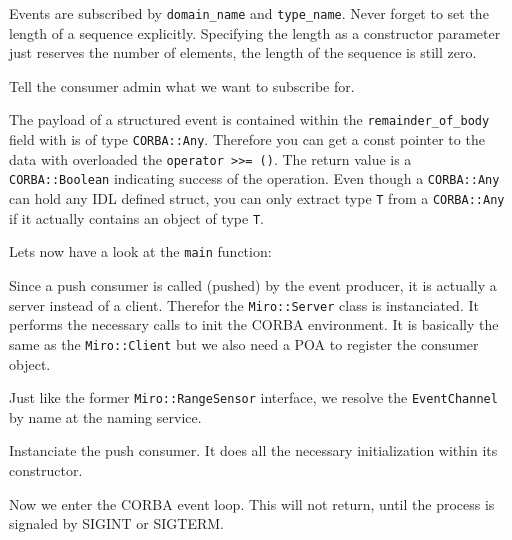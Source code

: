 

Events are subscribed by \lstinline!domain_name! and
\lstinline!type_name!. Never forget to set the length of a
sequence explicitly. Specifying the length as a constructor
parameter just reserves the number of elements, the length of the
sequence is still zero.



Tell the consumer admin what we want to subscribe for.



The payload of a structured event is contained within the
\lstinline!remainder_of_body! field with is of type
\lstinline!CORBA::Any!.  Therefore you can get a const pointer to the
data with overloaded the \lstinline!operator >>= ()!. The return value
is a \lstinline!CORBA::Boolean! indicating success of the operation.
Even though a \lstinline!CORBA::Any! can hold any IDL defined struct,
you can only extract type \lstinline!T! from a \lstinline!CORBA::Any!
if it actually contains an object of type \lstinline!T!.


\label{lst:SonarNotify2}

Lets now have a look at the \lstinline!main! function:



Since a push consumer is called (pushed) by the event producer, it
is actually a server instead of a client. Therefor the
\lstinline!Miro::Server!  class is instanciated. It performs the
necessary calls to init the CORBA environment. It is basically the
same as the \lstinline!Miro::Client!  but we also need a POA to
register the consumer object.



Just like the former \lstinline!Miro::RangeSensor! interface, we
resolve the \lstinline!EventChannel! by name at the naming service.



Instanciate the push consumer. It does all the necessary
initialization within its constructor.



Now we enter the CORBA event loop. This will not return, until the
process is signaled by SIGINT or SIGTERM.

